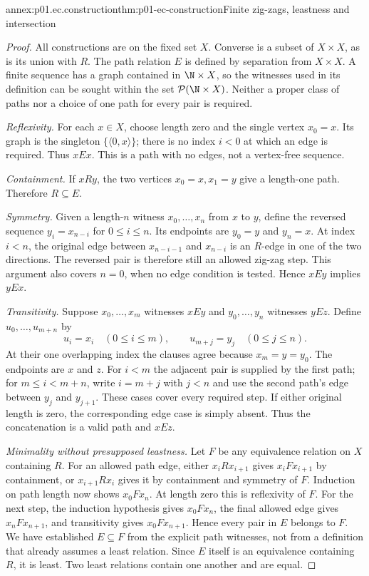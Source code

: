 \begin{annexitem}{annex:p01.ec.construction}{thm:p01-ec-construction}{Finite zig-zags, leastness and intersection}
\begin{proof}
All constructions are on the fixed set \(X\). Converse is a subset
of \(X\times X\), as is its union with \(R\). The path relation
\(E\) is defined by separation from \(X\times X\). A finite
sequence has a graph contained in \(\N\times X\), so the witnesses
used in its definition can be sought within the set
\(\mathcal P(\N\times X)\). Neither a proper class of paths nor
a choice of one path for every pair is required.

\emph{Reflexivity.} For each \(x\in X\), choose length zero and
the single vertex \(x_0=x\). Its graph is the singleton
\(\{\langle0,x\rangle\}\); there is no index \(i<0\) at which
an edge is required. Thus \(xEx\). This is a path with no edges,
not a vertex-free sequence.

\emph{Containment.} If \(xRy\), the two vertices \(x_0=x,x_1=y\)
give a length-one path. Therefore \(R\subseteq E\).

\emph{Symmetry.} Given a length-\(n\) witness
\(x_0,\ldots,x_n\) from \(x\) to \(y\), define the reversed
sequence \(y_i=x_{n-i}\) for \(0\leq i\leq n\).
Its endpoints are \(y_0=y\) and \(y_n=x\). At index \(i<n\),
the original edge between \(x_{n-i-1}\) and \(x_{n-i}\) is an
\(R\)-edge in one of the two directions. The reversed pair is
therefore still an allowed zig-zag step. This argument also covers
\(n=0\), when no edge condition is tested. Hence \(xEy\)
implies \(yEx\).

\emph{Transitivity.} Suppose \(x_0,\ldots,x_m\) witnesses
\(xEy\) and \(y_0,\ldots,y_n\) witnesses \(yEz\).
Define \(u_0,\ldots,u_{m+n}\) by
\[
 u_i=x_i\quad(0\leq i\leq m),\qquad
 u_{m+j}=y_j\quad(0\leq j\leq n).
\]
At their one overlapping index the clauses agree because
\(x_m=y=y_0\). The endpoints are \(x\) and \(z\).
For \(i<m\) the adjacent pair is supplied by the first path;
for \(m\leq i<m+n\), write \(i=m+j\) with \(j<n\)
and use the second path's edge between \(y_j\) and \(y_{j+1}\).
These cases cover every required step. If either original length
is zero, the corresponding edge case is simply absent. Thus the
concatenation is a valid path and \(xEz\).

\emph{Minimality without presupposed leastness.} Let \(F\) be any
equivalence relation on \(X\) containing \(R\). For an allowed
path edge, either \(x_iRx_{i+1}\) gives \(x_iFx_{i+1}\) by
containment, or \(x_{i+1}Rx_i\) gives it by containment and
symmetry of \(F\). Induction on path length now shows
\(x_0Fx_n\). At length zero this is reflexivity of \(F\).
For the next step, the induction hypothesis gives \(x_0Fx_n\),
the final allowed edge gives \(x_nFx_{n+1}\), and transitivity
gives \(x_0Fx_{n+1}\). Hence every pair in \(E\) belongs to
\(F\). We have established \(E\subseteq F\) from the explicit
path witnesses, not from a definition that already assumes a least
relation. Since \(E\) itself is an equivalence containing \(R\),
it is least. Two least relations contain one another and are equal.


\end{proof}
\end{annexitem}
